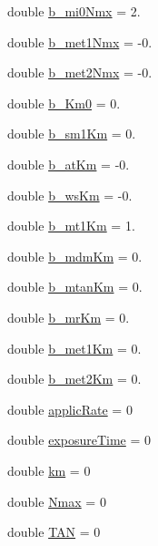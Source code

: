 \begin{DoxyCompactItemize}
double \mbox{\hyperlink{class_a_l_f_a_m_a61fa0cdf225aca15e38af987cd743fee}{b\+\_\+mi0\+Nmx}} = 2.
\item 
double \mbox{\hyperlink{class_a_l_f_a_m_a2ce56870ff473b39034b0ccc2324e5a9}{b\+\_\+met1\+Nmx}} = -\/0.
\item 
double \mbox{\hyperlink{class_a_l_f_a_m_a8c39e10a86a3645a3eb8057e6c34a9e5}{b\+\_\+met2\+Nmx}} = -\/0.
\item 
double \mbox{\hyperlink{class_a_l_f_a_m_af11a31c171d5d3ac45127ee4d6695980}{b\+\_\+\+Km0}} = 0.
\item 
double \mbox{\hyperlink{class_a_l_f_a_m_ac682bfd4b30db6ae7ef3416826d723b0}{b\+\_\+sm1\+Km}} = 0.
\item 
double \mbox{\hyperlink{class_a_l_f_a_m_ab06e11bdaaed997f3f6c4cafbebb8465}{b\+\_\+at\+Km}} = -\/0.
\item 
double \mbox{\hyperlink{class_a_l_f_a_m_a049bbe089c017d831f88ced26d47d3f8}{b\+\_\+ws\+Km}} = -\/0.
\item 
double \mbox{\hyperlink{class_a_l_f_a_m_a375ac169c8400161db686c499f0f98b5}{b\+\_\+mt1\+Km}} = 1.
\item 
double \mbox{\hyperlink{class_a_l_f_a_m_a3a5841a182efa3d2eb459685251e2731}{b\+\_\+mdm\+Km}} = 0.
\item 
double \mbox{\hyperlink{class_a_l_f_a_m_a97420e446a5c3ff4782a4e3459e56126}{b\+\_\+mtan\+Km}} = 0.
\item 
double \mbox{\hyperlink{class_a_l_f_a_m_a2a580260fb08cefccdcf59236090b149}{b\+\_\+mr\+Km}} = 0.
\item 
double \mbox{\hyperlink{class_a_l_f_a_m_ab0c9b715e0b11629652093747a4e2a26}{b\+\_\+met1\+Km}} = 0.
\item 
double \mbox{\hyperlink{class_a_l_f_a_m_afb713c277cbc896b038d493f2af143c4}{b\+\_\+met2\+Km}} = 0.
\item 
double \mbox{\hyperlink{class_a_l_f_a_m_ab656c7583f34299c9eb0185ca5ddc533}{applic\+Rate}} = 0
\item 
double \mbox{\hyperlink{class_a_l_f_a_m_ae6112359ba7fd8e1654c2a69009a2420}{exposure\+Time}} = 0
\item 
double \mbox{\hyperlink{class_a_l_f_a_m_ab4efd6087708a1b18feae7c4dab0882e}{km}} = 0
\item 
double \mbox{\hyperlink{class_a_l_f_a_m_a6f6fecb398e1e18a76b684aa7a09385c}{Nmax}} = 0
\item 
double \mbox{\hyperlink{class_a_l_f_a_m_a2d2c07644fb7d996f28d46a77133b996}{T\+AN}} = 0
\end{DoxyCompactItemize}



